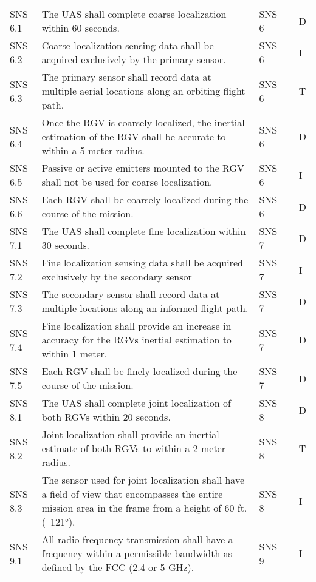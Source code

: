 \begin{tabular}{lllll}
SNS 6.1 & The UAS shall complete coarse localization within 60 seconds. & SNS 6 &  & D \\ 
SNS 6.2 & Coarse localization sensing data shall be acquired exclusively by the primary sensor. & SNS 6 &  & I \\ 
SNS 6.3 & The primary sensor shall record data at multiple aerial locations along an orbiting flight path. & SNS 6 &  & T \\ 
SNS 6.4 & Once the RGV is coarsely localized, the inertial estimation of the RGV shall be accurate to within a 5 meter radius. & SNS 6 &  & D \\ 
SNS 6.5 & Passive or active emitters mounted to the RGV shall not be used for coarse localization. & SNS 6 &  & I \\ 
SNS 6.6 & Each RGV shall be coarsely localized during the course of the mission. & SNS 6 &  & D \\ 
SNS 7.1 & The UAS shall complete fine localization within 30 seconds. & SNS 7 &  & D \\ 
SNS 7.2 & Fine localization sensing data shall be acquired exclusively by the secondary sensor & SNS 7 &  & I \\ 
SNS 7.3 & The secondary sensor shall record data at multiple locations along an informed flight path. & SNS 7 &  & D \\ 
SNS 7.4 & Fine localization shall provide an increase in accuracy for the RGVs inertial estimation to within 1 meter. & SNS 7 &  & D \\ 
SNS 7.5 & Each RGV shall be finely localized during the course of the mission. & SNS 7 &  & D \\ 
SNS 8.1 & The UAS shall complete joint localization of both RGVs within 20 seconds. & SNS 8 &  & D \\ 
SNS 8.2 & Joint localization shall provide an inertial estimate of both RGVs to within a 2 meter radius. & SNS 8 &  & T \\ 
SNS 8.3 & The sensor used for joint localization shall have a field of view that encompasses the entire mission area in the frame from a height of 60 ft. (~121°). & SNS 8 &  & I \\ 
SNS 9.1 & All radio frequency transmission shall have a frequency within a permissible bandwidth as defined by the FCC (2.4 or 5 GHz). & SNS 9 &  & I \\ 
\hline 
\end{tabular}